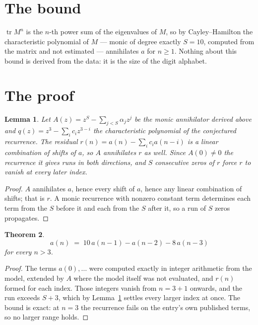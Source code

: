 \documentclass[11pt,a4paper]{article}
\theoremstyle{plain}
\newtheorem{theorem}{Theorem}
\newtheorem{lemma}[theorem]{Lemma}
\theoremstyle{definition}
\begin{document}
\section{The bound}

$\operatorname{tr}M^{n}$ is the $n$-th power sum of the eigenvalues of $M$, so by
Cayley--Hamilton the characteristic polynomial of $M$ --- monic of degree exactly $S=10$,
computed from the matrix and not estimated --- annihilates $a$ for $n\ge1$. Nothing about this
bound is derived from the data: it is the size of the digit alphabet.

\section{The proof}

\begin{lemma}\label{lem:crit}
Let $A(z)=z^S-\sum_{j<S}\alpha_jz^{j}$ be the monic annihilator derived above and
$q(z)=z^{3}-\sum_ic_iz^{3-i}$ the characteristic polynomial of the conjectured
recurrence. The residual $r(n)=a(n)-\sum_ic_ia(n-i)$ is a linear combination of shifts of $a$,
so $A$ annihilates $r$ as well. Since $A(0)\ne0$ the recurrence it gives runs in both
directions, and $S$ consecutive zeros of $r$ force $r$ to vanish at every later index.
\end{lemma}

\begin{proof}
$A$ annihilates $a$, hence every shift of $a$, hence any linear combination of shifts; that is
$r$. A monic recurrence with nonzero constant term determines each term from the $S$ before it
and each from the $S$ after it, so a run of $S$ zeros propagates.
\end{proof}

\begin{theorem}
\[
a(n)\;=\;10\,a(n-1) - a(n-2) - 8\,a(n-3)
\]
for every $n>3$.
\end{theorem}

\begin{proof}
The terms $a(0),\dots$ were computed exactly in integer arithmetic from the model, extended by
$A$ where the model itself was not evaluated, and $r(n)$ formed for each index. Those integers
vanish from $n=3+1$ onwards, and the run exceeds $S+3$, which by
Lemma~\ref{lem:crit} settles every larger index at once. The bound is exact: at $n=3$ the recurrence fails on the entry's own published terms, so no larger range holds.
\end{proof}
\end{document}
